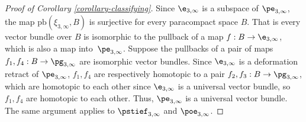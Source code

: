 \begin{proof}[Proof of Corollary \ref{corollary-classifying}]
Since $\e_{3,\infty}$ is a subspace of $\pe_{3,\infty}$, the map $\text{pb}(\xi_{3,\infty},B)$ is surjective for every paracompact space $B$. That is every vector bundle over $B$ is isomorphic to the pullback of a map $f : B \to \e_{3,\infty}$, which is also a map into~$\pe_{3,\infty}$.
Suppose the pullbacks of a pair of maps $f_1,f_4 : B \to \pg_{3,\infty}$ are isomorphic vector bundles.
Since $\e_{3,\infty}$ is a deformation retract of $\pe_{3,\infty}$, $f_1,f_4$ are respectively homotopic to a pair $f_2,f_3 : B \to \pg_{3,\infty}$, which are homotopic to each other since $\e_{3,\infty}$ is a universal vector bundle, so $f_1,f_4$ are homotopic to each other.
Thus, $\pe_{3,\infty}$ is a universal vector bundle.
The same argument applies to $\pstief_{3,\infty}$ and $\poe_{3,\infty}$.
\end{proof}

